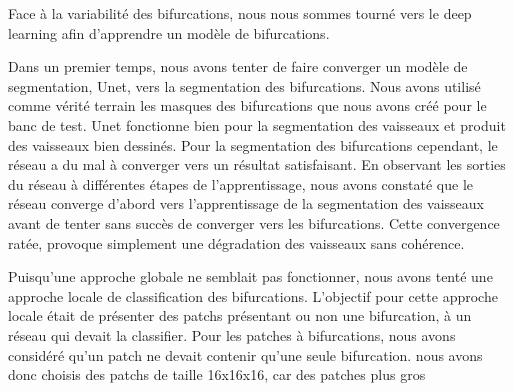 Face à la variabilité des bifurcations, nous nous sommes tourné vers le deep learning afin d'apprendre un modèle de bifurcations. 

Dans un premier temps, nous avons tenter de faire converger un modèle de segmentation, Unet, vers la segmentation des bifurcations. Nous avons utilisé comme vérité terrain les masques des bifurcations que nous avons créé pour le banc de test. Unet fonctionne bien pour la segmentation des vaisseaux et produit des vaisseaux bien dessinés. Pour la segmentation des bifurcations cependant, le réseau a du mal à converger vers un résultat satisfaisant. En observant les sorties du réseau à différentes étapes de l'apprentissage, nous avons constaté que le réseau converge d'abord vers l'apprentissage de la segmentation des vaisseaux avant de tenter sans succès de converger vers les bifurcations. Cette convergence ratée, provoque simplement une dégradation des vaisseaux sans cohérence. 

Puisqu'une approche globale ne semblait pas fonctionner, nous avons tenté une approche locale de classification des bifurcations. L'objectif pour cette approche locale était de présenter des patchs présentant ou non une bifurcation, à un réseau qui devait la classifier. Pour les patches à bifurcations, nous avons considéré qu'un patch ne devait contenir qu'une seule bifurcation. nous avons donc choisis des patchs de taille 16x16x16, car des patches plus gros 
